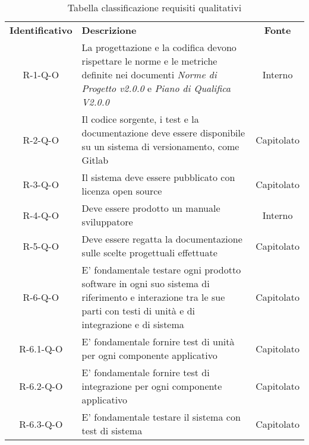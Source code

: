 \renewcommand{\arraystretch}{1.5}
\begin{longtable}{ c C{9cm} c }
    \caption{Tabella classificazione requisiti qualitativi}\\
    \rowcolor{\primaryColor}
    \textcolor{\secondaryColor}{
    \textbf{Identificativo}} & \textcolor{\secondaryColor}{\textbf{Descrizione}}                                                            & \textcolor{\secondaryColor}
    {\textbf{Fonte}}                                                                                                                                                      \\


    R-1-Q-O     & La progettazione e la codifica devono rispettare le norme e le metriche definite nei documenti \emph{Norme di Progetto v2.0.0} e \emph{Piano di Qualifica V2.0.0} & Interno\\
    R-2-Q-O     & Il codice sorgente, i test e la documentazione deve essere disponibile su un sistema di versionamento, come Gitlab & Capitolato\\
    R-3-Q-O     & Il sistema deve essere pubblicato con licenza open source & Capitolato\\
    R-4-Q-O     & Deve essere prodotto un manuale sviluppatore & Interno \\
    R-5-Q-O     & Deve essere regatta la documentazione sulle scelte progettuali effettuate & Capitolato \\
    R-6-Q-O     & E' fondamentale testare ogni prodotto software in ogni suo sistema di riferimento e interazione tra le sue parti con testi di unità e di integrazione e di sistema & Capitolato\\
    R-6.1-Q-O   & E' fondamentale fornire test di unità per ogni componente applicativo & Capitolato \\
    R-6.2-Q-O   & E' fondamentale fornire test di integrazione per ogni componente applicativo & Capitolato \\
    R-6.3-Q-O   & E' fondamentale testare il sistema con test di sistema & Capitolato \\




\end{longtable}